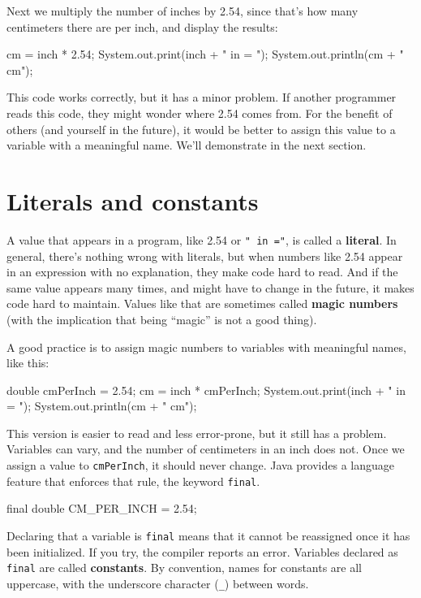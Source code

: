 \documentclass[12pt]{book}
\theoremstyle{exercise}
\newcommand{\java}[1]{\verb"#1"}
\begin{document}
Next we multiply the number of inches by 2.54, since that's how many centimeters there are per inch, and display the results:

\begin{code}
    cm = inch * 2.54;
    System.out.print(inch + " in = ");
    System.out.println(cm + " cm");
\end{code}

This code works correctly, but it has a minor problem.
If another programmer reads this code, they might wonder where 2.54 comes from.
For the benefit of others (and yourself in the future), it would be better to assign this value to a variable with a meaningful name.
We'll demonstrate in the next section.


\section{Literals and constants}


A value that appears in a program, like 2.54 or \verb|" in ="|, is called a {\bf literal}.
In general, there's nothing wrong with literals, but when numbers like 2.54 appear in an expression with no explanation, they make code hard to read.
And if the same value appears many times, and might have to change in the future, it makes code hard to maintain.
Values like that are sometimes called {\bf magic numbers} (with the implication that being ``magic'' is not a good thing).

A good practice is to assign magic numbers to variables with meaningful names, like this:

\begin{code}
    double cmPerInch = 2.54;
    cm = inch * cmPerInch;
    System.out.print(inch + " in = ");
    System.out.println(cm + " cm");
\end{code}

This version is easier to read and less error-prone, but it still has a problem.
Variables can vary, and the number of centimeters in an inch does not.
Once we assign a value to \java{cmPerInch}, it should never change.
Java provides a language feature that enforces that rule, the keyword \java{final}.

\begin{code}
    final double CM_PER_INCH = 2.54;
\end{code}


Declaring that a variable is \java{final} means that it cannot be reassigned once it has been initialized.
If you try, the compiler reports an error.
Variables declared as \java{final} are called {\bf constants}.
By convention, names for constants are all uppercase, with the underscore character (\verb|_|) between words.
\end{document}
